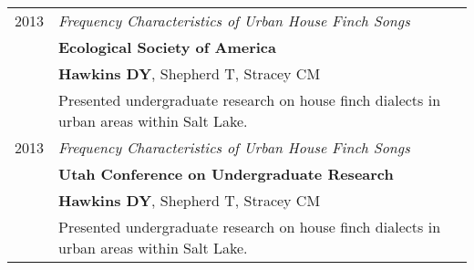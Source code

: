 \documentclass[a4paper,10pt]{report}
\begin{document}
\begin{longtable}{ll}
	\textsc{2013} & \emph{Frequency Characteristics of Urban House Finch Songs}                                         \\
	              & \textbf{Ecological Society of America}                                                              \\
	              & \footnotesize \textbf{Hawkins DY}, Shepherd T, Stracey CM                                           \\
	              & \small{Presented undergraduate research on house finch dialects in urban
	areas within Salt Lake.}                                                                                            \\

	\textsc{2013} & \emph{Frequency Characteristics of Urban House Finch Songs}                                         \\
	              & \textbf{Utah Conference on Undergraduate Research}                                                  \\
	              & \footnotesize \textbf{Hawkins DY}, Shepherd T, Stracey CM                                           \\
	              & \small{Presented undergraduate research on house finch dialects in urban
	areas within Salt Lake.}                                                                                            \\
\end{longtable}


\end{document}
